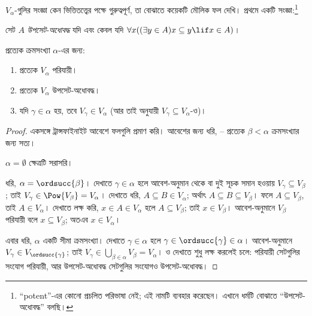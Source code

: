 \documentclass[../../../include/open-logic-section]{subfiles}
\begin{document}

$V_\alpha$-গুলির সংজ্ঞা কেন ভিত্তিতত্ত্বের পক্ষে
গুরুত্বপূর্ণ, তা বোঝাতে কয়েকটি মৌলিক ফল দেখি।
প্রথমে একটি সংজ্ঞা:\footnote{``potent''-এর কোনো
প্রচলিত পরিভাষা নেই; \citet{ButtonLT1} এই নামটি
ব্যবহার করেছেন। এখানে ধর্মটি বোঝাতে
``উপসেট-অধোবদ্ধ'' বলছি।}
\begin{defn}
সেট $A$ \emph{উপসেট-অধোবদ্ধ} যদি এবং কেবল যদি
$\forall x((\exists y \in A)x \subseteq y \lif x \in A)$।
\end{defn}
\begin{lem}
প্রত্যেক ক্রমসংখ্যা $\alpha$-এর জন্য:
\begin{enumerate}
	\item{} প্রত্যেক $V_\alpha$ পরিযায়ী।
	\item{} প্রত্যেক $V_\alpha$ উপসেট-অধোবদ্ধ।
	\item{} যদি $\gamma \in \alpha$ হয়, তবে $V_\gamma
	\in V_\alpha$ (আর তাই
	 অনুযায়ী
	$V_\gamma \subseteq V_\alpha$-ও)।
\end{enumerate}
\end{lem}

\begin{proof}
একসঙ্গে ট্রান্সফাইনাইট আবেশে ফলগুলি প্রমাণ
করি। আবেশের জন্য ধরি,
-- প্রত্যেক
$\beta < \alpha$ ক্রমসংখ্যার জন্য সত্য।

$\alpha = \emptyset$ ক্ষেত্রটি সরাসরি।

ধরি, $\alpha = \ordsucc{\beta}$।
 দেখাতে $\gamma \in \alpha$
হলে আবেশ-অনুমান থেকে বা দুই সূচক সমান হওয়ায়
$V_\gamma \subseteq V_\beta$; তাই
$V_\gamma \in \Pow{V_\beta} = V_\alpha$।
 দেখাতে ধরি,
$A \subseteq B \in V_\alpha$; অর্থাৎ
$A \subseteq B \subseteq V_\beta$। ফলে
$A \subseteq V_\beta$, তাই $A \in
V_\alpha$।  দেখাতে
লক্ষ করি, $x \in A \in V_\alpha$ হলে
$A \subseteq V_\beta$; তাই $x \in V_\beta$।
আবেশ-অনুমানে $V_\beta$ পরিযায়ী বলে
$x \subseteq V_\beta$; অতএব $x \in V_\alpha$।

এবার ধরি, $\alpha$ একটি সীমা ক্রমসংখ্যা।
 দেখাতে $\gamma \in \alpha$
হলে $\gamma \in \ordsucc{\gamma} \in \alpha$।
আবেশ-অনুমানে $V_\gamma \in
V_{\ordsucc{\gamma}}$; তাই
$V_\gamma \in \bigcup_{\beta \in \alpha} V_\beta = V_\alpha$।
 ও 
দেখাতে শুধু লক্ষ করলেই চলে: পরিযায়ী
সেটগুলির সংযোগ পরিযায়ী, আর
উপসেট-অধোবদ্ধ সেটগুলির সংযোগও
উপসেট-অধোবদ্ধ।
\end{proof}
\end{document}
